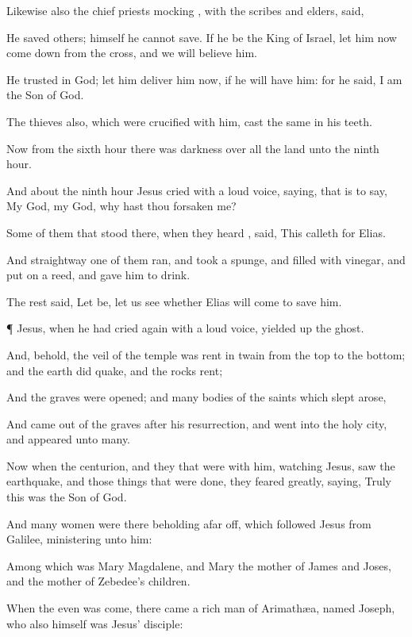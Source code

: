 {Likewise
also the chief
priests
mocking
{},
with the
scribes
and
elders,
said,

He
saved
others;
himself
he
cannot
save.
If he
be the
King of
Israel, let
him
now come
down
from the
cross,
and we will
believe
him.

He
trusted
in
God; let him
deliver
him
now,
if he will
have
him:
for he
said, I
am the
Son of
God.

The
thieves
also, which were crucified
with
him,
cast the
same in
his
teeth.

Now
from the
sixth
hour there
was
darkness
over
all the
land
unto the
ninth
hour.

And
about
the
ninth
hour
Jesus cried
with
a
loud
voice,
saying,
{}
that is to
say,
My
God,
my
God,
why hast thou
forsaken
me?

Some of them that
stood
there, when they
heard
{},
said,
This
{} calleth
for
Elias.

And
straightway
one
of
them
ran,
and
took a
spunge,
and
filled
{} with
vinegar,
and
put
{} on a
reed, and
gave
him to
drink.

The
rest
said, Let
be, let us
see
whether
Elias will
come to
save
him.


\par }{\PP {}¶
Jesus, when he had
cried
again
with
a
loud
voice, yielded
up the
ghost.

And,
behold, the
veil of the
temple was
rent
in
twain
from the
top
to the
bottom;
and the
earth did
quake,
and the
rocks
rent;

And the
graves were
opened;
and
many
bodies of the
saints which
slept
arose,

And came
out
of the
graves
after
his
resurrection, and
went
into
the
holy
city,
and
appeared unto
many.

Now
when the
centurion,
and they that
were
with
him,
watching
Jesus,
saw the
earthquake,
and those things that were
done, they
feared
greatly,
saying,
Truly
this
was the
Son of
God.

And
many
women
were
there
beholding
afar
off,
which
followed
Jesus
from
Galilee,
ministering unto
him:

Among
which
was
Mary
Magdalene,
and
Mary the
mother of
James
and
Joses,
and the
mother of
Zebedee’s
children.

When the
even was
come, there
came a
rich
man
of
Arimathæa,
named
Joseph,
who
also
himself
was
Jesus’
disciple:

}
